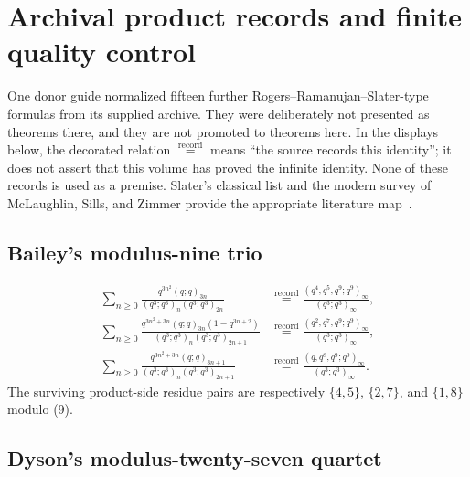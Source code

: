 \section{Archival product records and finite quality control}
\label{qg:sec-archival-product-records}

One donor guide normalized fifteen further Rogers--Ramanujan--Slater-type
formulas from its supplied archive.  They were deliberately not presented as
theorems there, and they are not promoted to theorems here.  In the displays
below, the decorated relation
\(\mathrel{\stackrel{\mathrm{record}}{=}}\) means ``the source records this
identity''; it does not assert that this volume has proved the infinite
identity.  None of these records is used as a premise.  Slater's classical
list and the modern survey of McLaughlin, Sills, and Zimmer provide the
appropriate literature map~\cite{Slater1952,McLaughlinSillsZimmer}.

\subsection{Bailey's modulus-nine trio}

\begin{align}
 \sum_{n\ge0}
 \frac{q^{3n^2}(q;q)_{3n}}
 {(q^3;q^3)_n(q^3;q^3)_{2n}}
 &\mathrel{\stackrel{\mathrm{record}}{=}}
 \frac{(q^4,q^5,q^9;q^9)_\infty}{(q^3;q^3)_\infty},
 \tag{SR-B9.1}\label{qg:eq-record-b9-1}\\
 \sum_{n\ge0}
 \frac{q^{3n^2+3n}(q;q)_{3n}(1-q^{3n+2})}
 {(q^3;q^3)_n(q^3;q^3)_{2n+1}}
 &\mathrel{\stackrel{\mathrm{record}}{=}}
 \frac{(q^2,q^7,q^9;q^9)_\infty}{(q^3;q^3)_\infty},
 \tag{SR-B9.2}\label{qg:eq-record-b9-2}\\
 \sum_{n\ge0}
 \frac{q^{3n^2+3n}(q;q)_{3n+1}}
 {(q^3;q^3)_n(q^3;q^3)_{2n+1}}
 &\mathrel{\stackrel{\mathrm{record}}{=}}
 \frac{(q,q^8,q^9;q^9)_\infty}{(q^3;q^3)_\infty}.
 \tag{SR-B9.3}\label{qg:eq-record-b9-3}
\end{align}
The surviving product-side residue pairs are respectively
\(\{4,5\}\), \(\{2,7\}\), and \(\{1,8\}\) modulo (9).

\subsection{Dyson's modulus-twenty-seven quartet}

